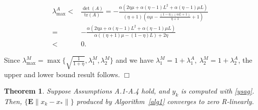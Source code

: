 \documentclass[11pt]{article}
\newtheorem{thm}{Theorem}
\newcommand{\E}{\mathbf{E}}
\begin{document}
\begin{align}\label{eq:lambdaA}
 \lambda_{\max}^A < & \frac{\det(A)}{\mbox{tr}(A)} = - \frac{\alpha  \left(2 \eta  \mu +\alpha  (\eta -1) L^2+\alpha  (\eta -1) \mu  L\right)}{(\eta +1) \left(\alpha  \mu -\frac{(1-\eta ) (\alpha  L+1)}{\eta +1}+1\right)} \\
                   =& -\frac{\alpha  \left(2 \eta  \mu +\alpha  (\eta -1) L^2+\alpha  (\eta -1) \mu  L\right)}{\alpha  ((\eta +1) \mu -  (1-\eta ) L)+2 \eta } \nonumber\\
				   < & 0 .\nonumber
\end{align}


Since $\lambda^M_{\max} = \max\{\sqrt{\frac{1}{1+\eta}},\lambda^M_1,\lambda^M_2\}$ and we have $\lambda^M_1=1+\lambda^A_1,\ \lambda^M_2=1+\lambda^A_2$, the upper and lower bound result follows.
\hspace*{\fill}$\Box$\medskip


\begin{thm}\label{thm:linear}
 Suppose Assumptions A.1-A.4 hold, and $y_k$ is computed with \eqref{ysag}.  Then, $\{\E\|x_k-x_\ast\|\}$ produced by Algorithm~\ref{alg1} converges to zero R-linearly.
\end{thm}
\end{document}
